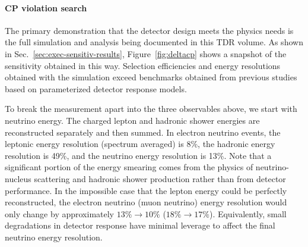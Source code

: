 \paragraph{\bf CP violation search}
The primary demonstration that the detector design meets
the physics needs is the full simulation and analysis
being documented in this TDR volume.  As shown in 
Sec.~\ref{sec:exec-sensitiv-results}, Figure~\ref{fig:deltacp}
shows a snapshot of the sensitivity obtained in this way.
Selection efficiencies and energy resolutions obtained with
the simulation exceed benchmarks obtained from previous 
studies based on parameterized detector response models.
%
\begin{comment}
Anne commented per ETW and Jon 1/25
\begin{dunefigure}
[Sensitivity for excluding
CP-conserving values of $\delta_{\rm{CP}}$ as a function
of true $\delta_{\rm{CP}}$]
{fig:deltacp}
{PRELIMINARY/Placeholder.  Sensitivity for excluding
CP-conserving values of $\delta_{\rm{CP}}$ as a function
of true $\delta_{\rm{CP}}$.  The black curve represents
the goal sensitivity as stated in the CDR.  The colored
curves represent successive improvements to the event
selection and energy reconstruction algorithms, which 
still continue.  The version labeled May~2018 
surpasses the selection efficiency and energy  
resolution goals, and this is reflected in the 
CPv reach.  Systematic uncertainty assumptions
for this plot come from the CDR.}
  \texttt{[image: deltacp.png]}
\end{dunefigure}
\end{comment}
To break the measurement apart into the three
observables above, we start with neutrino energy.
The charged lepton and hadronic shower energies are
reconstructed separately and then summed.  In electron
neutrino events, the leptonic energy resolution
(spectrum averaged) is 8\%, the hadronic energy resolution
is 49\%, and the neutrino energy resolution is 13\%.
Note that a significant portion of the energy smearing
comes from the physics of neutrino-nucleus scattering
and hadronic shower production rather than from detector
performance.  In the impossible case that the lepton
energy could be perfectly reconstructed, the electron
neutrino (muon neutrino) energy resolution would only
change by approximately $13\%\rightarrow 10\%$ 
($18\%\rightarrow 17\%$).
Equivalently, small degradations in detector response
have minimal leverage to affect the final neutrino energy
resolution.

